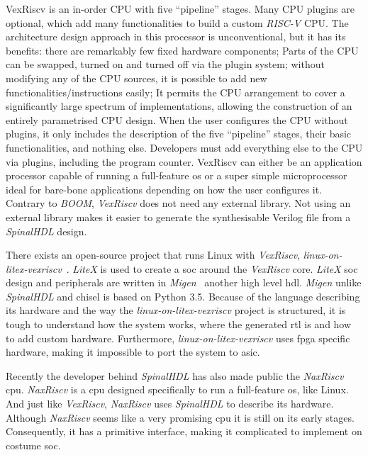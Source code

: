 VexRiscv is an in-order CPU with five \enquote{pipeline} stages. Many CPU plugins are optional, which add many functionalities to build a custom \textit{RISC-V} CPU. The architecture design approach in this processor is unconventional, but it has its benefits: there are remarkably few fixed hardware components; Parts of the CPU can be swapped, turned on and turned off via the plugin system; without modifying any of the CPU sources, it is possible to add new functionalities/instructions easily; It permits the CPU arrangement to cover a significantly large spectrum of implementations, allowing the construction of an entirely parametrised CPU design. When the user configures the CPU without plugins, it only includes the description of the five \enquote{pipeline} stages, their basic functionalities, and nothing else. Developers must add everything else to the CPU via plugins, including the program counter. VexRiscv can either be an application processor capable of running a full-feature \acrfull{os} or a super simple microprocessor ideal for bare-bone applications depending on how the user configures it. Contrary to \textit{BOOM}, \textit{VexRiscv} does not need any external library. Not using an external library makes it easier to generate the synthesisable Verilog file from a \textit{SpinalHDL} design.

There exists an open-source project that runs Linux with \textit{VexRiscv}, \textit{linux-on-litex-vexriscv}~\cite{litex_vexriscv}. \textit{LiteX} is used to create a \acrfull{soc} around the \textit{VexRiscv} core. \textit{LiteX} \acrshort{soc} design and peripherals are written in \textit{Migen}~\cite{bourdeauducq2012migen} another high level \acrshort{hdl}. \textit{Migen} unlike \textit{SpinalHDL} and  \acrshort{chisel} is based on Python 3.5. Because of the language describing its hardware and the way the \textit{linux-on-litex-vexriscv} project is structured, it is tough to understand how the system works, where the generated \acrshort{rtl} is and how to add custom hardware. Furthermore, \textit{linux-on-litex-vexriscv} uses \acrshort{fpga} specific hardware, making it impossible to port the system to \acrshort{asic}.

Recently the developer behind \textit{SpinalHDL} has also made public the \textit{NaxRiscv} \acrshort{cpu}. \textit{NaxRiscv} is a \acrshort{cpu} designed specifically to run a full-feature \acrlong{os}, like Linux. And just like \textit{VexRiscv}, \textit{NaxRiscv} uses \textit{SpinalHDL} to describe its hardware. Although \textit{NaxRiscv} seems like a very promising \acrshort{cpu} it is still on its early stages. Consequently, it has a primitive interface, making it complicated to implement on costume \acrfull{soc}.


